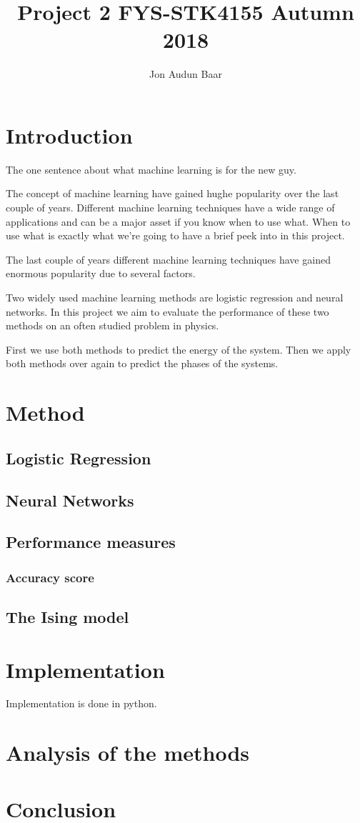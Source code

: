 \documentclass[a4paper,norsk]{article}
\title {Project 2 FYS-STK4155 Autumn 2018}
\author {Jon Audun Baar}
\begin{document}
\maketitle

\section{Introduction}
The one sentence about what machine learning is for the new guy.

The concept of machine learning have gained hughe popularity over the 
last couple of years. Different machine learning techniques 
have a wide range of applications and can be a major asset if you know when 
to use what. When to use what is exactly what we're going to have a brief
peek into in this project.

The last couple of years different machine learning techniques have
gained enormous popularity due to several factors. 

Two widely used machine learning methods
are logistic regression and neural networks. In this project we aim to
evaluate the performance of these two methods on an often studied problem
in physics.
\par
First we use both methods to predict the energy of the system. Then we 
apply both methods over again to predict the phases of the systems.
\section{Method}

\subsection{Logistic Regression}

\subsection{Neural Networks}

\subsection{Performance measures}

\subsubsection{Accuracy score}

\subsection{The Ising model}

\section{Implementation}
Implementation is done in python.

\section{Analysis of the methods}

\section{Conclusion}

{}

\end{document}
